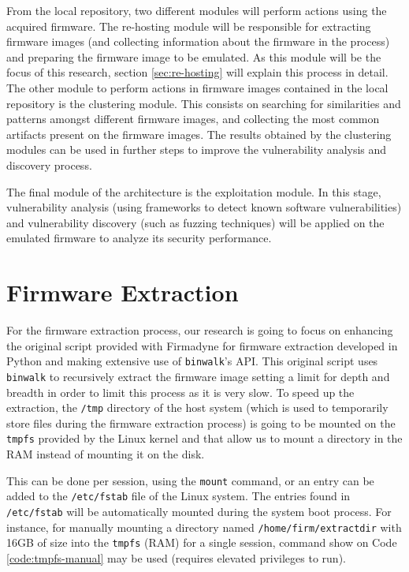 From the local repository, two different modules will perform actions using the acquired firmware. The re-hosting module will be responsible for extracting firmware images (and collecting information about the firmware in the process) and preparing the firmware image to be emulated. As this module will be the focus of this research, section \ref{sec:re-hosting} will explain this process in detail. The other module to perform actions in firmware images contained in the local repository is the clustering module. This consists on searching for similarities and patterns amongst different firmware images, and collecting the most common artifacts present on the firmware images. The results obtained by the clustering modules can be used in further steps to improve the vulnerability analysis and discovery process.

The final module of the architecture is the exploitation module. In this stage, vulnerability analysis (using frameworks to detect known software vulnerabilities) and vulnerability discovery (such as fuzzing techniques) will be applied on the emulated firmware to analyze its security performance.

\section{Firmware Extraction}
\label{sec:extraction}

For the firmware extraction process, our research is going to focus on enhancing the original script provided with Firmadyne \cite{firmadyne} for firmware extraction developed in Python and making extensive use of {\tt binwalk}'s API. This original script uses {\tt binwalk} to recursively extract the firmware image setting a limit for depth and breadth in order to limit this process as it is very slow. To speed up the extraction, the {\tt /tmp} directory of the host system (which is used to temporarily store files during the firmware extraction process) is going to be mounted on the {\tt tmpfs} provided by the Linux kernel and that allow us to mount a directory in the RAM instead of mounting it on the disk.

This can be done per session, using the {\tt mount} command, or an entry can be added to the {\tt /etc/fstab} file of the Linux system. The entries found in {\tt /etc/fstab} will be automatically mounted during the system boot process. For instance, for manually mounting a directory named {\tt /home/firm/extractdir} with 16GB of size into the {\tt tmpfs} (RAM) for a single session, command show on Code \ref{code:tmpfs-manual} may be used (requires elevated privileges to run).

